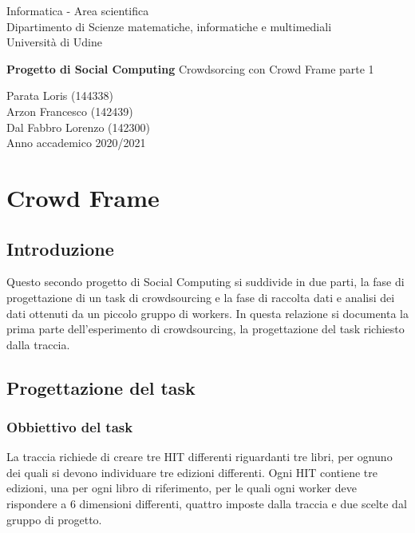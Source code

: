 \documentclass[a4paper,11pt]{report}
\begin{document}
\begin{titlepage}
  \clearpage\thispagestyle{empty}
  \centering
  \vspace{1cm}
  {\normalsize Informatica - Area scientifica \\  Dipartimento di Scienze matematiche, informatiche e multimediali\\  Università di Udine \par}
  \vspace{3cm}
  {\Huge \textbf{Progetto di Social Computing \newline
  } \LARGE{Crowdsorcing con Crowd Frame  parte 1}
  }

  \vspace{4cm}
  {\Large  Parata Loris (144338) \\ Arzon Francesco (142439)\\ Dal Fabbro Lorenzo (142300)\\ }
  \vspace{12cm}
  {\normalsize Anno accademico 2020/2021}
  \pagebreak
\end{titlepage}

\tableofcontents{}
\pagebreak
\chapter{Crowd Frame}
\section{Introduzione}
Questo secondo progetto di Social Computing si suddivide in due parti, la fase di progettazione di un task di crowdsourcing e la fase di raccolta dati e analisi dei dati ottenuti da un piccolo gruppo di workers.
In questa relazione si documenta  la prima parte dell'esperimento di crowdsourcing, la progettazione del task richiesto dalla traccia.


\section{Progettazione del task}

\subsection{Obbiettivo del task}
La traccia richiede di creare tre HIT differenti riguardanti tre libri, per ognuno dei quali si devono individuare tre edizioni differenti. Ogni HIT contiene tre edizioni, una per ogni libro di riferimento, per le quali ogni worker deve rispondere a 6 dimensioni differenti, quattro imposte dalla traccia e due scelte dal gruppo di progetto.
\end{document}

